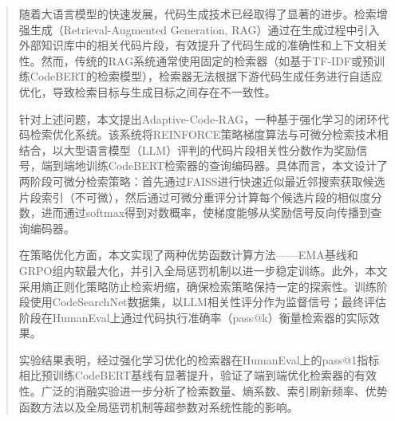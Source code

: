 \documentclass[
    fontset = win, %
  ]{njuthesis}
\begin{document}

\maketitle

\raggedbottom

\begin{abstract}

随着大语言模型的快速发展，代码生成技术已经取得了显著的进步。检索增强生成（Retrieval-Augmented Generation, RAG）通过在生成过程中引入外部知识库中的相关代码片段，有效提升了代码生成的准确性和上下文相关性。然而，传统的RAG系统通常使用固定的检索器（如基于TF-IDF或预训练CodeBERT的检索模型），检索器无法根据下游代码生成任务进行自适应优化，导致检索目标与生成目标之间存在不一致性。

针对上述问题，本文提出Adaptive-Code-RAG，一种基于强化学习的闭环代码检索优化系统。该系统将REINFORCE策略梯度算法与可微分检索技术相结合，以大型语言模型（LLM）评判的代码片段相关性分数作为奖励信号，端到端地训练CodeBERT检索器的查询编码器。具体而言，本文设计了两阶段可微分检索策略：首先通过FAISS进行快速近似最近邻搜索获取候选片段索引（不可微），然后通过可微分重评分计算每个候选片段的相似度分数，进而通过softmax得到对数概率，使梯度能够从奖励信号反向传播到查询编码器。

在策略优化方面，本文实现了两种优势函数计算方法——EMA基线和GRPO组内软最大化，并引入全局惩罚机制以进一步稳定训练。此外，本文采用熵正则化策略防止检索坍缩，确保检索策略保持一定的探索性。训练阶段使用CodeSearchNet数据集，以LLM相关性评分作为监督信号；最终评估阶段在HumanEval上通过代码执行准确率（pass@k）衡量检索器的实际效果。

实验结果表明，经过强化学习优化的检索器在HumanEval上的pass@1指标相比预训练CodeBERT基线有显著提升，验证了端到端优化检索器的有效性。广泛的消融实验进一步分析了检索数量、熵系数、索引刷新频率、优势函数方法以及全局惩罚机制等超参数对系统性能的影响。

\end{abstract}
\end{document}
